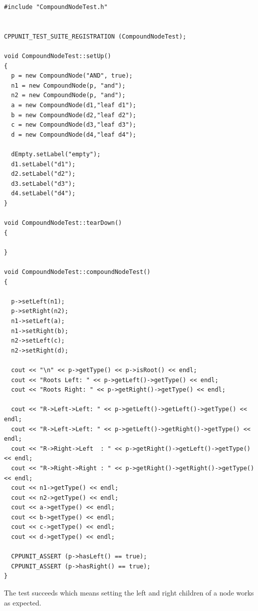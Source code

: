 \documentclass[10pt, a4paper, titlepage]{article}
\begin{document}
\small
\begin{lstlisting}
#include "CompoundNodeTest.h"


CPPUNIT_TEST_SUITE_REGISTRATION (CompoundNodeTest);

void CompoundNodeTest::setUp()
{
  p = new CompoundNode("AND", true);
  n1 = new CompoundNode(p, "and");
  n2 = new CompoundNode(p, "and");
  a = new CompoundNode(d1,"leaf d1");
  b = new CompoundNode(d2,"leaf d2");
  c = new CompoundNode(d3,"leaf d3");
  d = new CompoundNode(d4,"leaf d4");
  
  dEmpty.setLabel("empty");
  d1.setLabel("d1");
  d2.setLabel("d2");
  d3.setLabel("d3");
  d4.setLabel("d4");
}

void CompoundNodeTest::tearDown()
{

}

void CompoundNodeTest::compoundNodeTest()
{
   
  p->setLeft(n1);
  p->setRight(n2);
  n1->setLeft(a);
  n1->setRight(b);
  n2->setLeft(c);
  n2->setRight(d);
  
  cout << "\n" << p->getType() << p->isRoot() << endl;
  cout << "Roots Left: " << p->getLeft()->getType() << endl;
  cout << "Roots Right: " << p->getRight()->getType() << endl;

  cout << "R->Left->Left: " << p->getLeft()->getLeft()->getType() << endl;
  cout << "R->Left->Left: " << p->getLeft()->getRight()->getType() << endl;
  cout << "R->Right->Left  : " << p->getRight()->getLeft()->getType() << endl;
  cout << "R->Right->Right : " << p->getRight()->getRight()->getType() << endl;
  cout << n1->getType() << endl;
  cout << n2->getType() << endl;
  cout << a->getType() << endl;
  cout << b->getType() << endl;
  cout << c->getType() << endl;
  cout << d->getType() << endl;
  
  CPPUNIT_ASSERT (p->hasLeft() == true);
  CPPUNIT_ASSERT (p->hasRight() == true);
}
\end{lstlisting}
\large

The test succeeds which means setting the left and right children of a node works as expected. 
\end{document}
